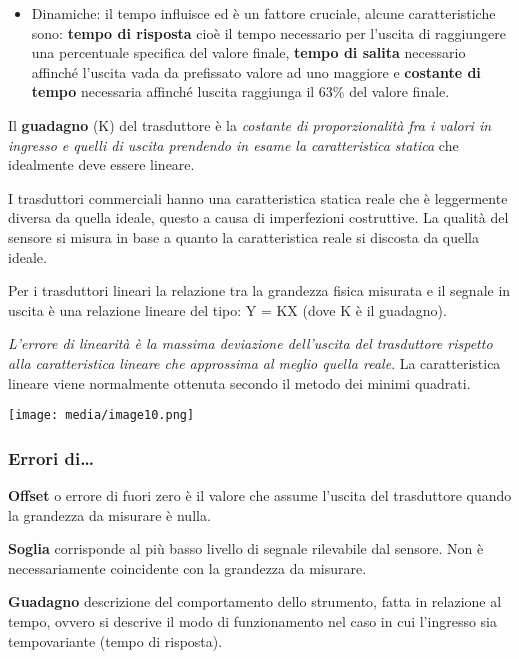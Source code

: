 \begin{itemize}
\item
  Dinamiche: il tempo influisce ed è un fattore cruciale, alcune
  caratteristiche sono: \textbf{tempo di risposta} cioè il tempo
  necessario per l'uscita di raggiungere una percentuale specifica del
  valore finale, \textbf{tempo di salita} necessario affinché l'uscita
  vada da prefissato valore ad uno maggiore e \textbf{costante di tempo}
  necessaria affinché l\textquotesingle uscita raggiunga il 63\% del
  valore finale.
\end{itemize}

Il \textbf{guadagno} (K) del trasduttore è la \emph{costante di
proporzionalità fra i valori in ingresso e quelli di uscita prendendo in
esame la caratteristica statica} che idealmente deve essere lineare.

I trasduttori commerciali hanno una caratteristica statica reale che è
leggermente diversa da quella ideale, questo a causa di imperfezioni
costruttive. La qualità del sensore si misura in base a quanto la
caratteristica reale si discosta da quella ideale.

Per i trasduttori lineari la relazione tra la grandezza fisica misurata
e il segnale in uscita è una relazione lineare del tipo: Y = KX (dove K
è il guadagno).

\emph{L'errore di linearità è la massima deviazione dell'uscita del
trasduttore rispetto alla caratteristica lineare che approssima al
meglio quella reale}. La caratteristica lineare viene normalmente
ottenuta secondo il metodo dei minimi quadrati.

\texttt{[image: media/image10.png]}

\subsubsection{Errori di\ldots{}}\label{errori-di}

\textbf{Offset} o errore di fuori zero è il valore che assume l'uscita
del trasduttore quando la grandezza da misurare è nulla.

\textbf{Soglia} corrisponde al più basso livello di segnale rilevabile
dal sensore. Non è necessariamente coincidente con la grandezza da
misurare.

\textbf{Guadagno} descrizione del comportamento dello strumento, fatta
in relazione al tempo, ovvero si descrive il modo di funzionamento nel
caso in cui l'ingresso sia tempovariante (tempo di risposta).

